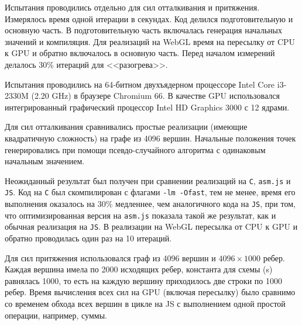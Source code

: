 Испытания проводились отдельно для сил отталкивания и притяжения. Измерялось время одной итерации в секундах. Код делился подготовительную и основную часть. В подготовительную часть включалась генерация начальных значений и компиляция. Для реализаций на WebGL время на пересылку от CPU к GPU и обратно включалось в основную часть. Перед началом измерений делалось $30\%$ итераций для <<разогрева>>.

Испытания проводились на 64-битном двухъядерном процессоре Intel Core i3-2330M (2.20 GHz) в браузере Chromium 66. В качестве GPU использовался интегрированный графический процессор Intel HD Graphics 3000 с 12 ядрами.

Для сил отталкивания сравнивались простые реализации (имеющие квадратичную сложность) на графе из 4096 вершин. Начальные положения точек генерировались при помощи псевдо-случайного алгоритма с одинаковым начальным значением.

Неожиданный результат был получен при сравнении реализаций на \texttt{C}, \texttt{asm.js} и \texttt{JS}. Код на \texttt{C} был скомпилирован с флагами \texttt{-lm -Ofast}, тем не менее, время его выполнения оказалось на $30\%$ медленнее, чем аналогичного кода на \texttt{JS}, при том, что оптимизированная версия на \texttt{asm.js} показала такой же результат, как и обычная реализация на \texttt{JS}. В реализации на WebGL пересылка от CPU к GPU и обратно проводилась один раз на 10 итераций.

Для сил притяжения использовался граф из 4096 вершин и $4096 \times 1000$ ребер. Каждая вершина имела по 2000 исходящих ребер, константа для схемы (s) равнялась 1000, то есть на каждую вершину приходилось две строки по 1000 ребер. Время вычисления всех сил на GPU (включая пересылку) было сравнимо со временем обхода всех вершин в цикле на JS с выполнением одной простой операции, например, суммы.


